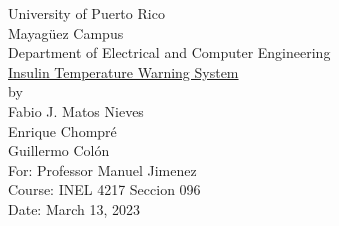 \begin{titlepage}
  \begin{center}
    \large{University of Puerto Rico\\
    Mayagüez Campus\\
    \vspace{\baselineskip}
    Department of Electrical and Computer Engineering\\}
    \vspace{6cm}
    \Huge{\underline{Insulin Temperature Warning System}\\}
    \vspace{0.5\baselineskip}
    \large by\\
    Fabio J. Matos Nieves\\
    Enrique Chompré\\
    Guillermo Colón\\
    \vspace{4.5cm}
    For: Professor Manuel Jimenez\\
    Course: INEL 4217 Seccion 096\\
    Date: March 13, 2023\\
    \normalsize

  \end{center}
\end{titlepage}
